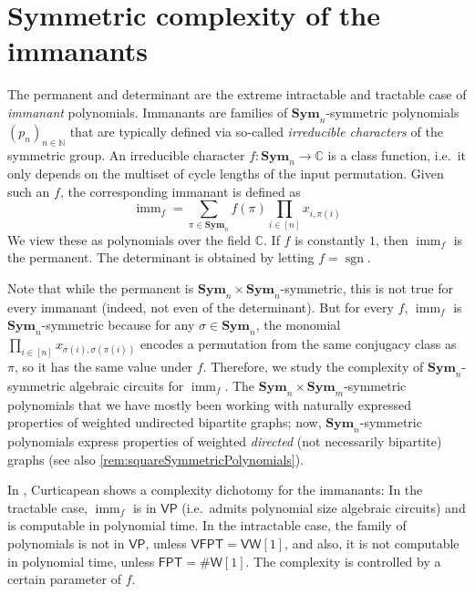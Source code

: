 \documentclass[10pt,a4paper]{article}
\theoremstyle{definition}
\theoremstyle{plain}
\theoremstyle{remark}
\newcommand{\Sym}{\mathbf{Sym}}
\newcommand{\bbN}{\mathbb{N}}
\DeclareMathOperator{\imm}{imm}
\DeclareMathOperator{\sgn}{sgn}
\newcommand{\VP}{\mathsf{VP}}
\newcommand{\VFPT}{\mathsf{VFPT}}
\newcommand{\VW}{\mathsf{VW}[1]}
\newcommand{\FPT}{\mathsf{FPT}}
\newcommand{\sharpW}{\#\mathsf{W}[1]}
\begin{document}
	
	\section{Symmetric complexity of the immanants}
	\label{sec:immanants}
	The permanent and determinant are the extreme intractable and tractable case of \emph{immanant} polynomials. Immanants are families of $\Sym_n$-symmetric polynomials $(p_n)_{n \in \bbN}$ that are typically defined via so-called \emph{irreducible characters} of the symmetric group. An irreducible character $f\colon \Sym_n \to \mathbb{C}$ is a class function, i.e.\ it only depends on the multiset of cycle lengths of the input permutation. Given such an $f$, the corresponding immanant is defined as
	\[
	\imm_{f} = \sum_{\pi \in \Sym_n} f(\pi) \prod_{i \in [n]} x_{i,\pi(i)}
	\]
	We view these as polynomials over the field $\mathbb{C}$. 
	If $f$ is constantly $1$, then $\imm_f$ is the permanent. The determinant is obtained by letting $f = \sgn$.
	
	Note that while the permanent is $\Sym_n \times
        \Sym_n$-symmetric, this is not true for every immanant
        (indeed, not even of the determinant).
	But for every $f$, $\imm_{f}$ is $\Sym_n$-symmetric because for any $\sigma \in \Sym_n$, the monomial $\prod_{i \in [n]} x_{\sigma(i),\sigma(\pi(i))}$ encodes a permutation from the same conjugacy class as $\pi$, so it has the same value under $f$. Therefore, we study the complexity of $\Sym_n$-symmetric algebraic circuits for $\imm_{f}$. 
	The $\Sym_n \times \Sym_m$-symmetric polynomials that we have mostly been working with naturally expressed properties of weighted undirected bipartite graphs; now, $\Sym_n$-symmetric polynomials express properties of weighted \emph{directed} (not necessarily bipartite) graphs (see also \cref{rem:squareSymmetricPolynomials}).
	
	In \cite{curticapean2021full}, Curticapean shows a complexity dichotomy for the immanants: In the tractable case, $\imm_{f}$ is in $\VP$ (i.e.\ admits polynomial size algebraic circuits) and is computable in polynomial time. In the intractable case, the family of polynomials is not in $\VP$, unless $\VFPT = \VW$, and also, it is not computable in polynomial time, unless $\FPT = \sharpW$. The complexity is controlled by a certain parameter of $f$. 
	
\end{document}

